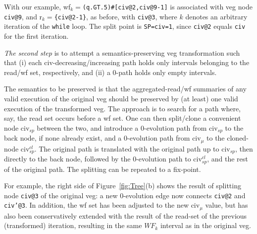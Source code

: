 \documentclass{sig-alternate}
\begin{document}
With our example, {\sc wf}$_k=${\tt (q.GT.5)\#[civ@2,civ@9-1]}
is associated with {\sc veg} node {\tt civ@9}, and 
{\sc r}$_k=${\tt \{civ@2-1\}}, as before, with {\tt civ@3}, 
where $k$ denotes an arbitrary iteration of the {\tt while} loop.
The split point is {\tt SP=civ=1}, since {\tt civ@2} equals {\tt civ} 
for the first iteration.



{\em The second step} is to attempt a semantics-preserving {\sc veg} transformation
such that (i) each {\sc civ}-decreasing/increasing path holds only intervals 
belonging to the read/{\sc wf} set, respectively, and (ii) a $0$-path holds
only empty intervals.

The semantics to be preserved is that the aggregated-read/{\sc wf} summaries of
any valid execution of the original {\sc veg} should be preserved by (at least) one 
valid execution of the transformed {\sc veg}.  The approach is
to search for a path where, say, the read set occurs before a {\sc wf} set.
One can then split/clone a convenient node {\sc civ}$_{sp}$ between the two, and 
introduce a $0$-evolution path from {\sc civ}$_{sp}$ to the back node, if none already exist,
and a $0$-evolution path from {\sc civ}$_\mu$ to the cloned-node {\sc civ}$_{sp}^{cl}$.
The original path is translated with the original path up to {\sc civ}$_{sp}$,
then directly to the back node, followed by the $0$-evolution path to  
{\sc civ}$_{sp}^{cl}$, and the rest of the original path. The splitting can be
repeated to a fix-point.

For example, the right side of Figure~\ref{fig:Tree}(b) shows the result of
splitting  node {\tt civ@3} of the original {\sc veg}: a new $0$-evolution
edge now connects {\tt civ@2} and {\tt civ'@3}. In addition, the {\sc wf} set 
has been adjusted to the new {\sc civ}$_\mu$ value, but has also
been conservatively extended with the result of the read-set of the previous
(transformed) iteration, resulting in the same $WF_k$ interval as 
in the original {\sc veg}. 
\end{document}
